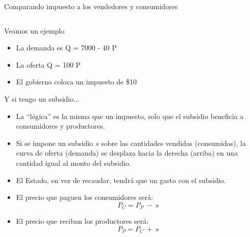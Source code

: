 \documentclass{beamer}
\begin{document}
\begin{frame}{Comparando impuesto a los vendedores y consumidores}
\begin{columns}
\begin{column}{0.49\textwidth}
    
    \end{column}
    \end{columns}
\end{frame}

\begin{frame}{Veamos un ejemplo}
\begin{itemize}
    \item La demanda es Q = 7000 - 40 P 
    \item La oferta Q = 100 P
    \item El gobierno coloca un impuesto de \$10
\end{itemize}
\end{frame}

\begin{frame}{Y si tengo un subsidio...}
    \begin{itemize}
        \item La ``lógica'' es la misma que un impuesto, solo que el subsidio beneficia a consumidores y productores. \vspace{1mm}
        \item Si se impone un subsidio $s$ sobre las cantidades vendidas (consumidas), la curva de oferta (demanda) se desplaza hacia la derecha (arriba) en una cantidad igual al monto del subsidio.
        \vspace{1mm}
        \item El Estado, en vez de recaudar, tendrá que un gasto con el subsidio.
        \vspace{1mm}
        \item El precio que paguen los consumidores será:
            \[ P_C = P_P\ - \ s\] 
        \item El precio que reciban los productores será:
            \[ P_P = P_C\ + \ s\]       
    \end{itemize}
\end{frame}
\end{document}
